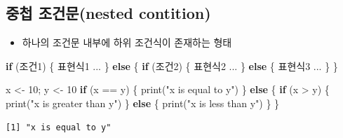 \documentclass[
  11pt,
]{krantz}
\newenvironment{Shaded}{\begin{snugshade}}{\end{snugshade}}
\newcommand{\ControlFlowTok}[1]{\textcolor[rgb]{0.27,0.27,0.27}{\textbf{#1}}}
\newcommand{\DecValTok}[1]{\textcolor[rgb]{0.06,0.06,0.06}{#1}}
\newcommand{\FunctionTok}[1]{\textcolor[rgb]{0,0,0}{#1}}
\newcommand{\NormalTok}[1]{#1}
\newcommand{\OtherTok}[1]{\textcolor[rgb]{0.37,0.37,0.37}{#1}}
\newcommand{\SpecialCharTok}[1]{\textcolor[rgb]{0,0,0}{#1}}
\newcommand{\StringTok}[1]{\textcolor[rgb]{0.5,0.5,0.5}{#1}}
\providecommand{\tightlist}{%
  \setlength{\itemsep}{0pt}\setlength{\parskip}{0pt}}
\begin{document}
\hypertarget{nest-cond}{%
\subsection{\texorpdfstring{\textbf{중첩 조건문(nested contition)}}{중첩 조건문(nested contition)}}\label{nest-cond}}

\begin{itemize}
\tightlist
\item
  하나의 조건문 내부에 하위 조건식이 존재하는 형태
\end{itemize}

\footnotesize

\begin{Shaded}
\begin{Highlighting}[]
\ControlFlowTok{if}\NormalTok{ (조건1) \{}
\NormalTok{  표현식1 }
\NormalTok{  ...}
\NormalTok{\} }\ControlFlowTok{else}\NormalTok{ \{}
  \ControlFlowTok{if}\NormalTok{ (조건2) \{}
\NormalTok{    표현식2}
\NormalTok{    ...}
\NormalTok{  \} }\ControlFlowTok{else}\NormalTok{ \{}
\NormalTok{    표현식3}
\NormalTok{    ...}
\NormalTok{  \}}
\NormalTok{\}}
\end{Highlighting}
\end{Shaded}

\normalsize

\footnotesize

\begin{Shaded}
\begin{Highlighting}[]
\NormalTok{x }\OtherTok{\textless{}{-}} \DecValTok{10}\NormalTok{; y }\OtherTok{\textless{}{-}} \DecValTok{10}
\ControlFlowTok{if}\NormalTok{ (x }\SpecialCharTok{==}\NormalTok{ y) \{}
  \FunctionTok{print}\NormalTok{(}\StringTok{"x is equal to y"}\NormalTok{)}
\NormalTok{\} }\ControlFlowTok{else}\NormalTok{ \{}
  \ControlFlowTok{if}\NormalTok{ (x }\SpecialCharTok{\textgreater{}}\NormalTok{ y) \{}
    \FunctionTok{print}\NormalTok{(}\StringTok{"x is greater than y"}\NormalTok{)}
\NormalTok{  \} }\ControlFlowTok{else}\NormalTok{ \{}
    \FunctionTok{print}\NormalTok{(}\StringTok{"x is less than y"}\NormalTok{)}
\NormalTok{  \}}
\NormalTok{\}}
\end{Highlighting}
\end{Shaded}

\begin{verbatim}
[1] "x is equal to y"
\end{verbatim}

\normalsize

\footnotesize
\end{document}
